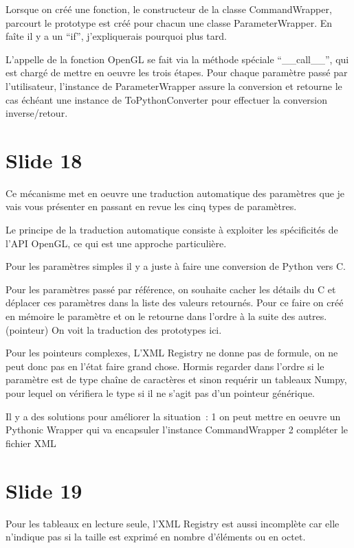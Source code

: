 \documentclass[12pt]{article}
\begin{document}
Lorsque on créé une fonction, le constructeur de la classe CommandWrapper, parcourt le prototype est
créé pour chacun une classe ParameterWrapper. En faîte il y a un ``if'', j'expliquerais pourquoi
plus tard.

L'appelle de la fonction OpenGL se fait via la méthode spéciale ``__call__'', qui est chargé de
mettre en oeuvre les trois étapes. Pour chaque paramètre passé par l'utilisateur, l'instance de
ParameterWrapper assure la conversion et retourne le cas échéant une instance de ToPythonConverter
pour effectuer la conversion inverse/retour. 

\section{Slide 18}

Ce mécanisme met en oeuvre une traduction automatique des paramètres que je vais vous présenter en
passant en revue les cinq types de paramètres.

Le principe de la traduction automatique consiste à exploiter les spécificités de l'API OpenGL, ce
qui est une approche particulière.

Pour les paramètres simples il y a juste à faire une conversion de Python vers C.

Pour les paramètres passé par référence, on souhaite cacher les détails du C et déplacer ces
paramètres dans la liste des valeurs retournés. Pour ce faire on créé en mémoire le paramètre et on
le retourne dans l'ordre à la suite des autres. (pointeur) On voit la traduction des prototypes ici.

Pour les pointeurs complexes, L'XML Registry ne donne pas de formule, on ne peut donc pas en l'état
faire grand chose. Hormis regarder dans l'ordre si le paramètre est de type chaîne de caractères et
sinon requérir un tableaux Numpy, pour lequel on vérifiera le type si il ne s'agit pas d'un pointeur
générique.

Il y a des solutions pour améliorer la situation~:
 1 on peut mettre en oeuvre un Pythonic Wrapper qui va encapsuler l'instance CommandWrapper
 2 compléter le fichier XML

\section{Slide 19}

Pour les tableaux en lecture seule, l'XML Registry est aussi incomplète car elle n'indique pas si la
taille est exprimé en nombre d'éléments ou en octet.
\end{document}
